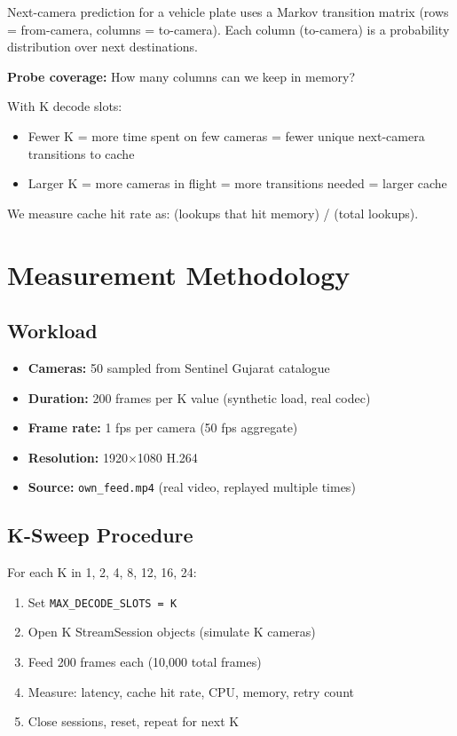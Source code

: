 \documentclass[sigconf,review]{acmart}
\begin{document}
Next-camera prediction for a vehicle plate uses a Markov transition matrix (rows = from-camera, columns = to-camera).
Each column (to-camera) is a probability distribution over next destinations.

\textbf{Probe coverage:} How many columns can we keep in memory?

With K decode slots:
\begin{itemize}
  \item Fewer K = more time spent on few cameras = fewer unique next-camera transitions to cache
  \item Larger K = more cameras in flight = more transitions needed = larger cache
\end{itemize}

We measure cache hit rate as: (lookups that hit memory) / (total lookups).

\section{Measurement Methodology}

\subsection{Workload}

\begin{itemize}
  \item \textbf{Cameras:} 50 sampled from Sentinel Gujarat catalogue
  \item \textbf{Duration:} 200 frames per K value (synthetic load, real codec)
  \item \textbf{Frame rate:} 1 fps per camera (50 fps aggregate)
  \item \textbf{Resolution:} 1920×1080 H.264
  \item \textbf{Source:} \texttt{own\_feed.mp4} (real video, replayed multiple times)
\end{itemize}

\subsection{K-Sweep Procedure}

For each K in {1, 2, 4, 8, 12, 16, 24}:
\begin{enumerate}
  \item Set \texttt{MAX\_DECODE\_SLOTS = K}
  \item Open K StreamSession objects (simulate K cameras)
  \item Feed 200 frames each (10,000 total frames)
  \item Measure: latency, cache hit rate, CPU, memory, retry count
  \item Close sessions, reset, repeat for next K
\end{enumerate}
\end{document}
